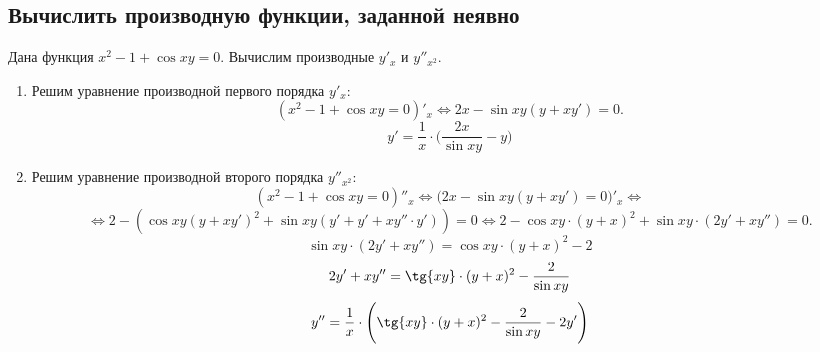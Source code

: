 \documentclass{article}
\newcommand{\mysection}[3]{\setcounter{section}{#1}\setcounter{subsection}{#2}\addtocounter{subsection}{-1}\subsection{#3}}
\begin{document}
\clearpage
\mysection{2}{7}{Вычислить производную функции, заданной неявно}
Дана функция $x^2-1+\cos{xy} = 0$. Вычислим производные $y'_x$ и $y''_{x^2}$.
\begin{enumerate}
    \item Решим уравнение производной первого порядка $y'_x$:
        \begin{equation*}
            (x^2-1+\cos{xy} = 0)'_x \Leftrightarrow 2x-\sin{xy}(y+xy') = 0.
        \end{equation*}
        \begin{equation*}
            y' = \dfrac{1}{x} \cdot \Bigg( \dfrac{2x}{\sin{xy}} - y \Bigg)
        \end{equation*}
    \item Решим уравнение производной второго порядка $y''_{x^2}$:
\begin{equation*}
(x^2-1+\cos{xy} = 0)''_x \Leftrightarrow
\big(2x-\sin{xy}(y+xy') = 0)'_x \Leftrightarrow
\end{equation*}
\begin{equation*}
\Leftrightarrow
2 - (\cos{xy}(y+xy')^2 + \sin{xy}(y'+y'+xy'' \cdot y')) = 0 \Leftrightarrow
2 - \cos{xy} \cdot (y+x)^2+\sin{xy} \cdot (2y'+xy'') = 0.
\end{equation*}
\begin{equation*}
    \sin{xy} \cdot (2y'+xy'') = \cos{xy} \cdot (y+x)^2 - 2
\end{equation*}
\begin{equation*}
    2y'+xy'' = \tg{xy} \cdot (y+x)^2 - \dfrac{2}{\sin{xy}}
\end{equation*}
\begin{equation*}
    y'' = \dfrac{1}{x} \cdot \Bigg( \tg{xy} \cdot (y+x)^2 - \dfrac{2}{\sin{xy}} -2y' \Bigg)
\end{equation*}
\end{enumerate}
\end{document}
